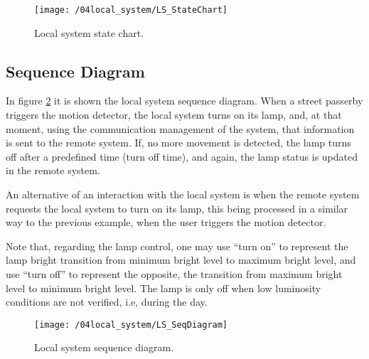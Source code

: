 \begin{figure}[ht]
	\centering
	\texttt{[image: /04local\_system/LS\_StateChart]}
	\caption{Local system state chart.}
	\label{fig:ls_state_chart}
\end{figure}

\clearpage
\subsection{Sequence Diagram}
In figure \ref{fig:ls_seq_diagram} it is shown the local system sequence diagram. When a street passerby triggers the motion detector, the local system turns on its lamp, and, at that moment, using the communication management of the system, that information is sent to the remote system. If, no more movement is detected, the lamp turns off after a predefined time (turn off time), and again, the lamp status is updated in the remote system.

An alternative of an interaction with the local system is when the remote system requests the local system to turn on its lamp, this being processed in a similar way to the previous example, when the user triggers the motion detector.

Note that, regarding the lamp control, one may use “turn on” to represent the lamp bright transition from minimum bright level to maximum bright level, and use “turn off” to represent the opposite, the transition from maximum bright level to minimum bright level. The lamp is only off when low luminosity conditions are not verified, i.e, during the day.

\begin{figure}[ht]
	\centering
	\texttt{[image: /04local\_system/LS\_SeqDiagram]}
	\caption{Local system sequence diagram.}
	\label{fig:ls_seq_diagram}
\end{figure}